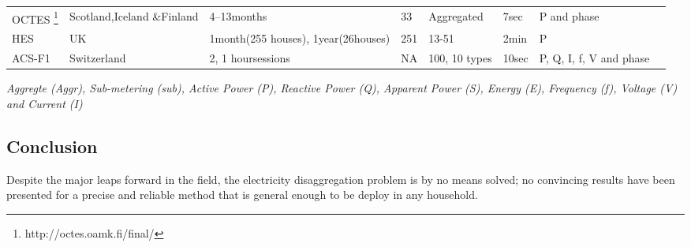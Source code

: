 \begin{landscape}
\begin{table}[]
{\begin{tabular}{p{4cm}p{2cm}p{3cm}p{2cm}p{3cm}p{5cm}p{5cm}p{7cm}}
				OCTES \footnote{http://octes.oamk.fi/final/} & Scotland,Iceland \&Finland & 4–13months & 33 & Aggregated & 7sec & P and phase &  \\
				HES & UK & 1month(255 houses), 1year(26houses) & 251 & 13-51 & 2min & P &  \\
				ACS-F1 \citep{Gisler2013} & Switzerland & 2, 1 hoursessions & NA & 100, 10 types & 10sec & P, Q, I, f, V and phase & \\
				\bottomrule 
			\end{tabular}%
		}
		\label{tab:dataset}%
		\raggedright{\textit{Aggregte (Aggr), Sub-metering (sub), Active Power (P), Reactive Power (Q), Apparent Power (S), Energy (E), Frequency (f), Voltage (V) and Current (I)}}
	\end{table}
\end{landscape}
\subsection{Conclusion}
Despite the major leaps forward in the field, the electricity disaggregation problem is by no means solved; no convincing results have been presented for a precise and reliable method that is general enough to be deploy in any household.






























































